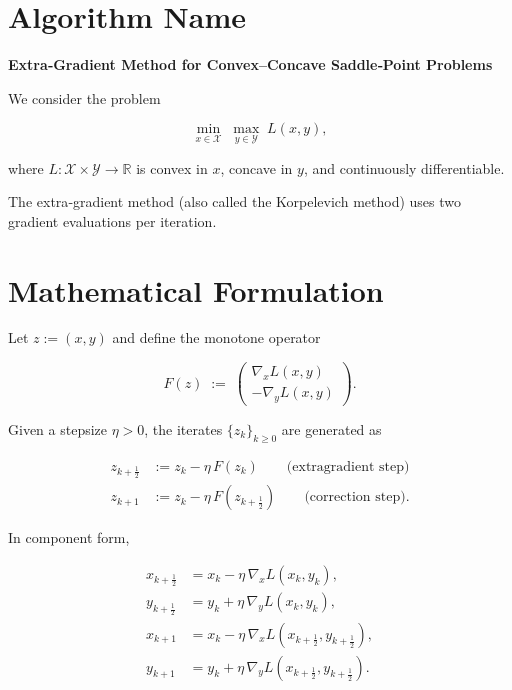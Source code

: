 \documentclass{article}
\begin{document}
\section*{Algorithm Name}
\textbf{Extra‑Gradient Method for Convex–Concave Saddle‑Point Problems}  

We consider the problem  

\[
\min_{x\in\mathcal X}\;\max_{y\in\mathcal Y} \; L(x,y),
\]

where $L:\mathcal X\times\mathcal Y\rightarrow\mathbb R$ is convex in $x$,
concave in $y$, and continuously differentiable.  

The extra‑gradient method (also called the Korpelevich method) uses two
gradient evaluations per iteration.

\section*{Mathematical Formulation}
Let $z:=(x,y)$ and define the monotone operator  

\[
F(z)\;:=\;\begin{pmatrix}
\nabla_{x}L(x,y)\\[2mm]
-\nabla_{y}L(x,y)
\end{pmatrix}.
\]

Given a stepsize $\eta>0$, the iterates $\{z_k\}_{k\ge 0}$ are generated as

\[
\boxed{
\begin{aligned}
z_{k+\frac12}&:=z_k-\eta\,F(z_k) \qquad\text{(extragradient step)}\\[1mm]
z_{k+1}&:=z_k-\eta\,F(z_{k+\frac12}) \qquad\text{(correction step)} .
\end{aligned}}
\tag{EG}
\]

In component form,

\[
\begin{aligned}
x_{k+\frac12}&=x_k-\eta\,\nabla_xL(x_k,y_k),\\
y_{k+\frac12}&=y_k+\eta\,\nabla_yL(x_k,y_k),\\[1mm]
x_{k+1}&=x_k-\eta\,\nabla_xL(x_{k+\frac12},y_{k+\frac12}),\\
y_{k+1}&=y_k+\eta\,\nabla_yL(x_{k+\frac12},y_{k+\frac12}).
\end{aligned}
\tag{1}
\]
\end{document}
